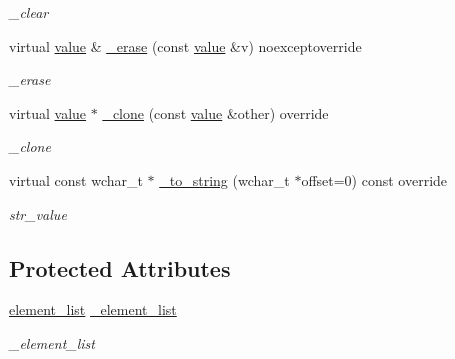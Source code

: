 \begin{DoxyCompactItemize}
\begin{DoxyCompactList}\small\item\em \+\_\+clear \end{DoxyCompactList}\item 
virtual \hyperlink{classformat_1_1value_aa6b85823936bf7b8ab78d3f8d443c00d}{value} \& \hyperlink{classformat_1_1array_a543a2cf1adc8ff7f91eea7ea881c0247}{\+\_\+erase} (const \hyperlink{classformat_1_1value_aa6b85823936bf7b8ab78d3f8d443c00d}{value} \&v) noexceptoverride
\begin{DoxyCompactList}\small\item\em \+\_\+erase \end{DoxyCompactList}\item 
virtual \hyperlink{classformat_1_1value_aa6b85823936bf7b8ab78d3f8d443c00d}{value} $\ast$ \hyperlink{classformat_1_1array_abd0469398fdb7eed92ef3b785a94ae8f}{\+\_\+clone} (const \hyperlink{classformat_1_1value_aa6b85823936bf7b8ab78d3f8d443c00d}{value} \&other) override
\begin{DoxyCompactList}\small\item\em \+\_\+clone \end{DoxyCompactList}\item 
virtual const wchar\+\_\+t $\ast$ \hyperlink{classformat_1_1array_a3a8da80fceac963967b0d6d08a69ed18}{\+\_\+to\+\_\+string} (wchar\+\_\+t $\ast$offset=0) const override
\begin{DoxyCompactList}\small\item\em str\+\_\+value \end{DoxyCompactList}\end{DoxyCompactItemize}
\subsection*{Protected Attributes}
\begin{DoxyCompactItemize}
\item 
\hyperlink{classformat_1_1array_a7167dd5489c3b9baeff3c937523f2a00}{element\+\_\+list} \hyperlink{classformat_1_1array_a2d0d6853c95777dd971c713a1cfcf50c}{\+\_\+element\+\_\+list}\hypertarget{classformat_1_1array_a2d0d6853c95777dd971c713a1cfcf50c}{}\label{classformat_1_1array_a2d0d6853c95777dd971c713a1cfcf50c}

\begin{DoxyCompactList}\small\item\em \+\_\+element\+\_\+list \end{DoxyCompactList}\end{DoxyCompactItemize}
